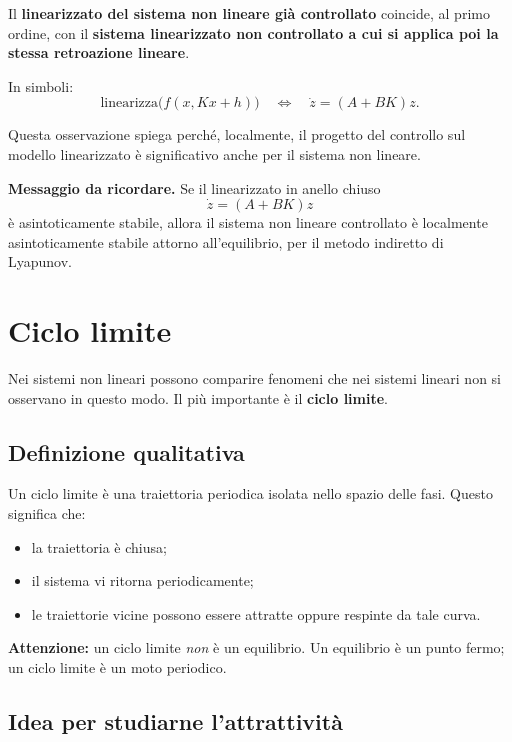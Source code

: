 Il \textbf{linearizzato del sistema non lineare gi\`a controllato} coincide, al primo ordine, con il \textbf{sistema linearizzato non controllato a cui si applica poi la stessa retroazione lineare}.

\medskip

\noindent
In simboli:
\[
\text{linearizza}\bigl(f(x,Kx+h)\bigr)
\quad \Longleftrightarrow \quad
\dot z = (A+BK)z.
\]

Questa osservazione spiega perch\'e, localmente, il progetto del controllo sul modello linearizzato \`e significativo anche per il sistema non lineare.

\medskip

\noindent
\textbf{Messaggio da ricordare.}
Se il linearizzato in anello chiuso
\[
\dot z=(A+BK)z
\]
\`e asintoticamente stabile, allora il sistema non lineare controllato \`e localmente asintoticamente stabile attorno all'equilibrio, per il metodo indiretto di Lyapunov.

\section{Ciclo limite}

Nei sistemi non lineari possono comparire fenomeni che nei sistemi lineari non si osservano in questo modo. Il pi\`u importante \`e il \textbf{ciclo limite}.

\subsection{Definizione qualitativa}

Un ciclo limite \`e una traiettoria periodica isolata nello spazio delle fasi.  
Questo significa che:

\begin{itemize}
    \item la traiettoria \`e chiusa;
    \item il sistema vi ritorna periodicamente;
    \item le traiettorie vicine possono essere attratte oppure respinte da tale curva.
\end{itemize}

\medskip

\noindent
\textbf{Attenzione:} un ciclo limite \emph{non} \`e un equilibrio.  
Un equilibrio \`e un punto fermo; un ciclo limite \`e un moto periodico.

\subsection{Idea per studiarne l'attrattivit\`a}

